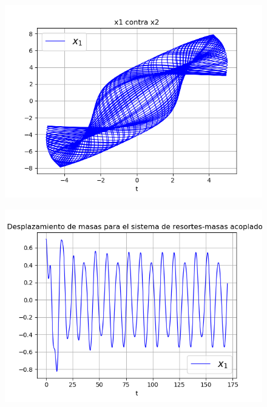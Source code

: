 \documentclass{article}
\begin{document}
\begin{figure}[H]
\centering
\includegraphics[scale=0.59]{33_v.png}
\end{figure}

\begin{figure}[H]
\centering
\includegraphics[scale=0.59]{41_d1.png}
\end{figure}
\end{document}
